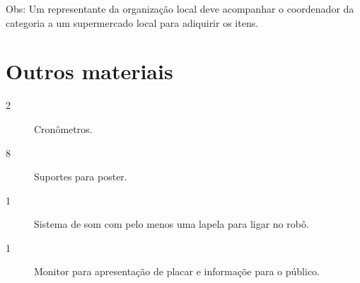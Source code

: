 \documentclass[11pt, twoside, openright, a4paper, chapterprefix]{article}
\begin{document}

Obs: Um representante da organização local deve acompanhar o coordenador da categoria a um supermercado local para adiquirir os itens.

\section{Outros materiais}

\begin{description}
    \item [2] Cronômetros.
    \item [8] Suportes para poster.
    \item [1] Sistema de som com pelo menos uma lapela para ligar no robô.    
    \item [1] Monitor para apresentação de placar e informaçõe para o público.
\end{description}
\end{document}
